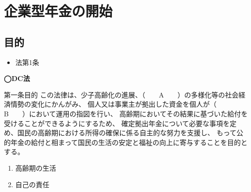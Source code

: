 \section{企業型年金の開始}

\subsection{目的}

\begin{InyouJobunbox}
  \begin{itemize}
    \item 法第1条
  \end{itemize}
\end{InyouJobunbox}

\begin{fillblank}[年金1 2025 問題1(2)アイ]
  \noindent \textbf{◯DC法}
  \begin{lawstructure}
    \begin{lawarticle}{第一条}{目的}
      この法律は、少子高齢化の進展、（　　A　　）の多様化等の社会経済情勢の変化にかんがみ、
      個人又は事業主が拠出した資金を個人が（　　B　　）において運用の指図を行い、
      高齢期においてその結果に基づいた給付を受けることができるようにするため、
      確定拠出年金について必要な事項を定め、国民の高齢期における所得の確保に係る自主的な努力を支援し、
      もって公的年金の給付と相まって国民の生活の安定と福祉の向上に寄与することを目的とする。
    \end{lawarticle}
  \end{lawstructure}
\end{fillblank}

\begin{answerbox}
 \begin{enumerate}[A:]
    \item 高齢期の生活
    \item 自己の責任
  \end{enumerate}
\end{answerbox}



